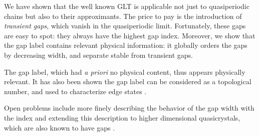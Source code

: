 \documentclass[a4paper]{jpconf}
\begin{document}
We have shown that the well known GLT is applicable not just to quasiperiodic chains but also to their approximants.
The price to pay is the introduction of \emph{transient gaps}, which vanish in the quasiperiodic limit. 
Fortunately, these gaps are easy to spot: they always have the highest gap index.
Moreover, we show that the gap label contains relevant physical information: it globally orders the gaps by decreasing width, and separate stable from transient gaps.

The gap label, which had \emph{a priori} no physical content, thus appears physically relevant.
It has also been shown the gap label can be considered as a topological number, and used to characterize edge states \cite{Levy2015}.

Open problems include more finely describing the behavior of the gap width with the index and extending this description to higher dimensional quasicrystals, which are also known to have gaps \cite{Zijlstra, penrosegaps}.

\printbibliography
\end{document}
